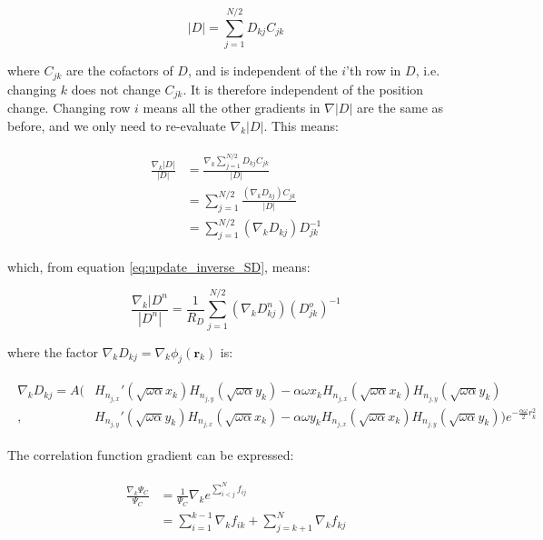 \documentclass[english, a4paper]{article}
\newcommand{\bm}[1]{\mathbf{#1}}
\begin{document}
	\begin{equation}
	|D| = \sum_{j=1}^{N/2}D_{kj}C_{jk}
	\end{equation}
	
	where $C_{jk}$ are the cofactors of $D$, and is independent of the $i$'th row in $D$, i.e. changing $k$ does not change $C_{jk}$. It is therefore independent of the position change. Changing row $i$ means all the other gradients in $\nabla|D|$ are the same as before, and we only need to re-evaluate $\nabla_k|D|$. This means:
	
	\begin{align}
	\begin{split}
	\frac{\nabla_k|D|}{|D|} &= \frac{\nabla_k\sum_{j=1}^{N/2}D_{kj}C_{jk}}{|D|}\\
	&= \sum_{j=1}^{N/2}\frac{(\nabla_kD_{kj})C_{jk}}{|D|}\\
	&= \sum_{j=1}^{N/2}(\nabla_kD_{kj})D_{jk}^{-1}
	\end{split}
	\end{align}
	
	which, from equation \ref{eq:update_inverse_SD}, means:
	
	\begin{equation}
	\frac{\nabla_k|D^n}{|D^n|} = \frac{1}{R_D}\sum_{j=1}^{N/2}(\nabla_kD_{kj}^n)(D_{jk}^o)^{-1}
	\end{equation}
	
	where the factor $\nabla_kD_{kj} = \nabla_k \phi_j(\bm{r}_k)$ is:
	
	\begin{align}
		\begin{split}
		\nabla_kD_{kj} = A\Big(&H_{n_{j,x}}'(\sqrt{\omega\alpha}x_k)H_{n_{j,y}}(\sqrt{\omega\alpha}y_k) - \alpha\omega x_kH_{n_{j,x}}(\sqrt{\omega\alpha}x_k)H_{n_{j,y}}(\sqrt{\omega\alpha}y_k)\\
		,&H_{n_{j,y}}'(\sqrt{\omega\alpha}y_k)H_{n_{j,x}}(\sqrt{\omega\alpha}x_k) - \alpha\omega y_kH_{n_{j,x}}(\sqrt{\omega\alpha}x_k)H_{n_{j,y}}(\sqrt{\omega\alpha}y_k)\Big)e^{-\frac{\alpha\omega}{2}r_k^2}
		\end{split}
	\end{align}

	The correlation function gradient can be expressed:
	
	\begin{align}
	\begin{split}
	\frac{\nabla_k \Psi_C}{\Psi_C} &= \frac{1}{\Psi_C}\nabla_k e^{\sum_{i<j}^Nf_{ij}}\\
	&= \sum_{i=1}^{k-1}\nabla_kf_{ik} + \sum_{j=k+1}^{N}\nabla_kf_{kj}
	\end{split}
	\end{align}
	
\end{document}
